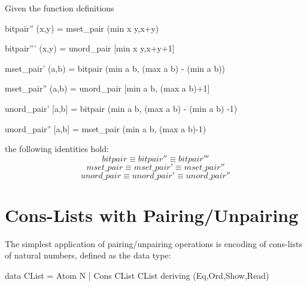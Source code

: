 \documentclass[]{INCLUDES/llncs}
\begin{document}
\begin{prop}
Given the function definitions
\begin{code}
bitpair'' (x,y) = mset_pair (min x y,x+y) 

bitpair''' (x,y) = unord_pair [min x y,x+y+1]

mset_pair' (a,b) = bitpair (min a b, (max a b) - (min a b)) 

mset_pair'' (a,b) = unord_pair [min a b, (max a b)+1]

unord_pair' [a,b] = bitpair (min a b, (max a b) - (min a b) -1) 

unord_pair'' [a,b] = mset_pair (min a b, (max a b)-1)
\end{code}
the following identities hold:
\begin{equation}
bitpair \equiv bitpair'' \equiv bitpair '''
\end{equation}
\begin{equation} \label{mseteq}
mset\_pair \equiv mset\_pair' \equiv mset\_pair ''
\end{equation}
\begin{equation}
unord\_pair \equiv unord\_pair' \equiv unord\_pair ''
\end{equation}
\end{prop}

\section{Cons-Lists with Pairing/Unpairing}

The simplest application of pairing/unpairing operations is encoding
of cons-lists of natural numbers, defined as the data type:
\begin{code}
data CList = Atom N | Cons CList CList 
  deriving (Eq,Ord,Show,Read)
\end{code}
\end{document}

